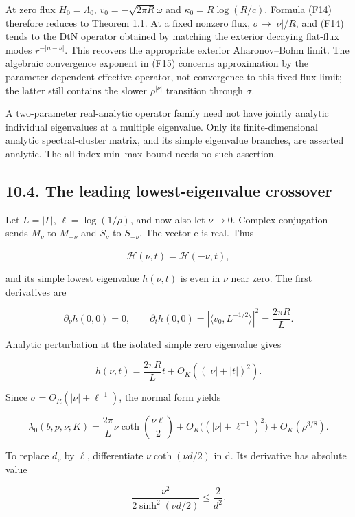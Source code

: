 \documentclass[11pt]{article}
\begin{document}
At zero flux \(H_0=\Lambda_0\), \(v_0=-\sqrt{2\pi R}\omega\) and
\(\kappa_0=R\log(R/c)\). Formula (F14) therefore reduces to Theorem 1.1.
At a fixed nonzero flux, \(\sigma\to|\nu|/R\), and (F14) tends to the
DtN operator obtained by matching the exterior decaying flat-flux modes
\(r^{-|n-\nu|}\). This recovers the appropriate exterior Aharonov--Bohm
limit. The algebraic convergence exponent in (F15) concerns
approximation by the parameter-dependent effective operator, not
convergence to this fixed-flux limit; the latter still contains the
slower \(\rho^{|\nu|}\) transition through \(\sigma\).

A two-parameter real-analytic operator family need not have jointly
analytic individual eigenvalues at a multiple eigenvalue. Only its
finite-dimensional analytic spectral-cluster matrix, and its simple
eigenvalue branches, are asserted analytic. The all-index min--max bound
needs no such assertion.

\subsection{10.4. The leading lowest-eigenvalue
crossover}\label{the-leading-lowest-eigenvalue-crossover}

Let \(L=|\Gamma|\), \(\ell=\log(1/\rho)\), and now also let \(\nu\to0\).
Complex conjugation sends \(M_\nu\) to \(M_{-\nu}\) and \(S_\nu\) to
\(S_{-\nu}\). The vector e is real. Thus

\[\overline{\mathcal H(\nu,t)}=\mathcal H(-\nu,t),\]

and its simple lowest eigenvalue \(h(\nu,t)\) is even in \(\nu\) near
zero. The first derivatives are

\[\partial_\nu h(0,0)=0,\qquad
\partial_t h(0,0)=|\langle v_0,L^{-1/2}\rangle|^2=\frac{2\pi R}{L}.\]

Analytic perturbation at the isolated simple zero eigenvalue gives

\[h(\nu,t)=\frac{2\pi R}{L}t+O_K((|\nu|+|t|)^2).\]

Since \(\sigma=O_R(|\nu|+\ell^{-1})\), the normal form yields

\[\lambda_0(b,p,\nu;K)=\frac{2\pi}{L}\nu\coth\left(\frac{\nu\ell}{2}\right)
+O_K\bigl((|\nu|+\ell^{-1})^2\bigr)+O_K(\rho^{3/8}).\tag{F16}\]

To replace \(d_\nu\) by \(\ell\), differentiate \(\nu\coth(\nu d/2)\) in
d. Its derivative has absolute value

\[\frac{\nu^2}{2\sinh^2(\nu d/2)}\leq\frac2{d^2}.\]
\end{document}
